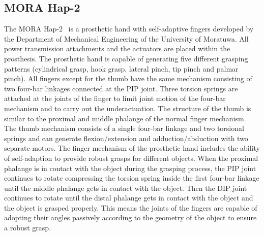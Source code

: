 \documentclass[a4paper, 10pt, conference]{ieeeconf}      %
\begin{document}
\subsection{MORA Hap-2}

The MORA Hap-2~\cite{morahap2} is a prosthetic hand with self-adaptive fingers developed by the Department of Mechanical Engineering of the University of Moratuwa. All power transmission attachments and the actuators are placed within the prosthesis. The prosthetic hand is capable of generating five different grasping patterns (cylindrical grasp, hook grasp, lateral pinch, tip pinch and palmar pinch). All fingers except for the thumb have the same mechanism consisting of two four-bar linkages connected at the PIP joint. Three torsion springs are attached at the joints of the finger to limit joint motion of the four-bar mechanism and to carry out the underactuation. The structure of the thumb is similar to the proximal and middle phalange of the normal finger mechanism. The thumb mechanism consists of a single four-bar linkage and two torsional springs and can generate flexion/extension and adduction/abduction with two separate motors. The finger mechanism of the prosthetic hand includes the ability of self-adaption to provide robust grasps for different objects. When the proximal phalange is in contact with the object during the grasping process, the PIP joint continues to rotate compressing the torsion spring inside the first four-bar linkage until the middle phalange gets in contact with the object. Then the DIP joint continues to rotate until the distal phalange gets in contact with the object and the object is grasped properly. This means the joints of the fingers are capable of adopting their angles passively according to the geometry of the object to ensure a robust grasp.



\newpage~\newpage
\end{document}
